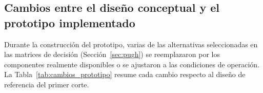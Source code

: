 \subsection{Cambios entre el diseño conceptual y el prototipo implementado}\label{sec:cambios_prototipo}

Durante la construcción del prototipo, varias de las alternativas seleccionadas en las matrices de decisión (Sección~\ref{sec:pugh}) se reemplazaron por los componentes realmente disponibles o se ajustaron a las condiciones de operación. La Tabla~\ref{tab:cambios_prototipo} resume cada cambio respecto al diseño de referencia del primer corte.


